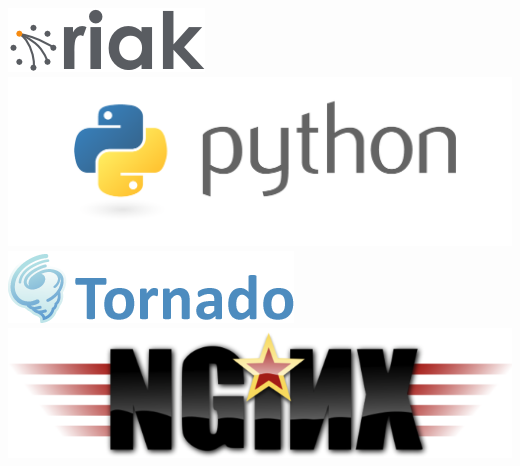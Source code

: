\documentclass[landscape,a0paper,final,showframe]{baposter}
\begin{document}
\begin{poster}
{	\includegraphics[scale=0.6]{images/logo-riak.png}
	\includegraphics[scale=0.2]{images/python-logo.png}
	\includegraphics[scale=0.5]{images/tornado-logo.png}
	\includegraphics[scale=0.3]{images/nginx-logo.png}

  }

\end{poster}
\end{document}
